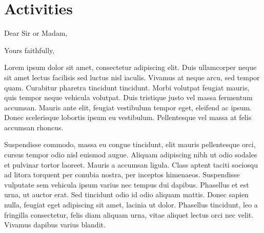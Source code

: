 \documentclass[11pt,letter,sans]{moderncv}
\begin{document}
\section{Activities}



\clearpage
\date{January 01, 1984}
\opening{Dear Sir or Madam,}
\closing{Yours faithfully,}
\makelettertitle

Lorem ipsum dolor sit amet, consectetur adipiscing elit. Duis ullamcorper neque sit amet lectus facilisis sed luctus nisl iaculis. Vivamus at neque arcu, sed tempor quam. Curabitur pharetra tincidunt tincidunt. Morbi volutpat feugiat mauris, quis tempor neque vehicula volutpat. Duis tristique justo vel massa fermentum accumsan. Mauris ante elit, feugiat vestibulum tempor eget, eleifend ac ipsum. Donec scelerisque lobortis ipsum eu vestibulum. Pellentesque vel massa at felis accumsan rhoncus.

Suspendisse commodo, massa eu congue tincidunt, elit mauris pellentesque orci, cursus tempor odio nisl euismod augue. Aliquam adipiscing nibh ut odio sodales et pulvinar tortor laoreet. Mauris a accumsan ligula. Class aptent taciti sociosqu ad litora torquent per conubia nostra, per inceptos himenaeos. Suspendisse vulputate sem vehicula ipsum varius nec tempus dui dapibus. Phasellus et est urna, ut auctor erat. Sed tincidunt odio id odio aliquam mattis. Donec sapien nulla, feugiat eget adipiscing sit amet, lacinia ut dolor. Phasellus tincidunt, leo a fringilla consectetur, felis diam aliquam urna, vitae aliquet lectus orci nec velit. Vivamus dapibus varius blandit.
\end{document}
